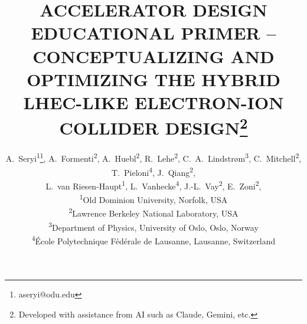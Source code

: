 \documentclass[%
               refpage,       %
               biblatex,     %
               hyphens,      %
               ]{jacow}
\begin{document}



\title{ACCELERATOR DESIGN EDUCATIONAL PRIMER – CONCEPTUALIZING AND OPTIMIZING THE HYBRID LHEC-LIKE ELECTRON-ION COLLIDER DESIGN\thanks{Developed with assistance from AI such as Claude, Gemini, etc.}}

\author{
A.~Seryi\textsuperscript{1}\thanks{aseryi@odu.edu},
A.~Formenti\textsuperscript{2}, 
A.~Huebl\textsuperscript{2}, 
R.~Lehe\textsuperscript{2},
C.~A.~Lindstrøm\textsuperscript{3},
C.~Mitchell\textsuperscript{2}, 
T.~Pieloni\textsuperscript{4}, 
J.~Qiang\textsuperscript{2}, \\
L.~van Riesen-Haupt\textsuperscript{1},
L.~Vanhecke\textsuperscript{4},
J.-L.~Vay\textsuperscript{2}, 
E.~Zoni\textsuperscript{2}, \\
\textsuperscript{1}Old Dominion University, Norfolk, USA \\
\textsuperscript{2}Lawrence Berkeley National Laboratory, USA\\
\textsuperscript{3}Department of Physics, University of Oslo, Oslo, Norway\\
\textsuperscript{4}École Polytechnique Fédérale de Lausanne, Lausanne, Switzerland
}


%
\end{document}
